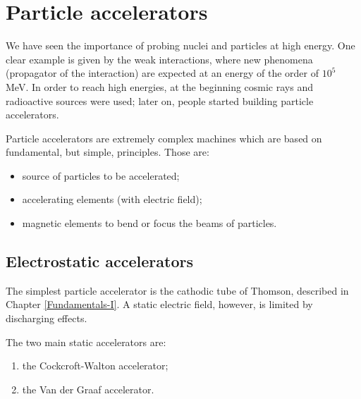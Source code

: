 %
%
%
\label{accelerators} %
\section{Particle accelerators}
We have seen the importance of probing nuclei and particles at high energy. One clear example is given by the weak interactions, where new phenomena (propagator of the interaction) are expected at an energy of the order of $10^5$ MeV. In order to reach high energies, at the beginning  cosmic rays and radioactive sources were used; later on, people started building particle accelerators.

Particle accelerators are extremely complex machines which are based on fundamental, but simple, principles. Those are:
\begin{itemize}
  \item source of particles to be accelerated;
  \item accelerating elements (with electric field);
  \item magnetic elements to bend or focus the beams of particles.
\end{itemize}

\subsection{Electrostatic accelerators}
The simplest particle accelerator is the cathodic tube of Thomson, described in Chapter \ref{Fundamentals-I}. A static electric field, however, is limited by discharging effects. 

The two main static accelerators are:
\begin{enumerate}
    \item \label{item2:Cockroft-Walton} the Cockcroft-Walton accelerator;
    \item \label{item2:Van der Graaf} the Van der Graaf accelerator.
\end{enumerate}

